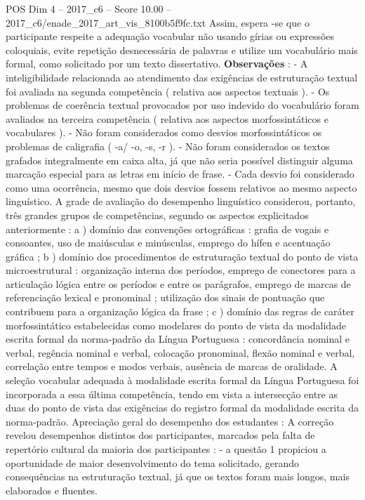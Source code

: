 \begin{textsample}{POS Dim 4 – 2017\_c6 – Score 10.00 – 2017\_c6/enade\_2017\_art\_vis\_8100b5f9fc.txt}
Assim, espera -se que o participante respeite a adequação vocabular não usando gírias ou expressões coloquiais, evite repetição desnecessária de palavras e utilize um vocabulário mais formal, como solicitado por um texto dissertativo. \textbf{Observações} : - A inteligibilidade relacionada ao atendimento das exigências de estruturação textual foi avaliada na segunda competência ( relativa aos aspectos textuais ). - Os problemas de coerência textual provocados por uso indevido do vocabulário foram avaliados na terceira competência ( relativa aos aspectos morfossintáticos e vocabulares ). - Não foram considerados como desvios morfossintáticos os problemas de caligrafia ( -a/ -o, -s, -r ). - Não foram considerados os textos grafados integralmente em caixa alta, já que não seria possível distinguir alguma marcação especial para as letras em início de frase. - Cada desvio foi considerado como uma ocorrência, mesmo que dois desvios fossem relativos ao mesmo aspecto linguístico.
A grade de avaliação do desempenho linguístico considerou, portanto, três grandes grupos de competências, segundo os aspectos explicitados anteriormente : a ) domínio das convenções ortográficas : grafia de vogais e consoantes, uso de maiúsculas e minúsculas, emprego do hífen e acentuação gráfica ; b ) domínio dos procedimentos de estruturação textual do ponto de vista microestrutural : organização interna dos períodos, emprego de conectores para a articulação lógica entre os períodos e entre os parágrafos, emprego de marcas de referenciação lexical e pronominal ; utilização dos sinais de pontuação que contribuem para a organização lógica da frase ; c ) domínio das regras de caráter morfossintático estabelecidas como modelares do ponto de vista da modalidade escrita formal da norma-padrão da Língua Portuguesa : concordância nominal e verbal, regência nominal e verbal, colocação pronominal, flexão nominal e verbal, correlação entre tempos e modos verbais, ausência de marcas de oralidade.
A seleção vocabular adequada à modalidade escrita formal da Língua Portuguesa foi incorporada a essa última competência, tendo em vista a intersecção entre as duas do ponto de vista das exigências do registro formal da modalidade escrita da norma-padrão.
Apreciação geral do desempenho dos estudantes : A correção revelou desempenhos distintos dos participantes, marcados pela falta de repertório cultural da maioria dos participantes : - a questão 1 propiciou a oportunidade de maior desenvolvimento do tema solicitado, gerando consequências na estruturação textual, já que os textos foram mais longos, mais elaborados e fluentes.

\end{textsample}
